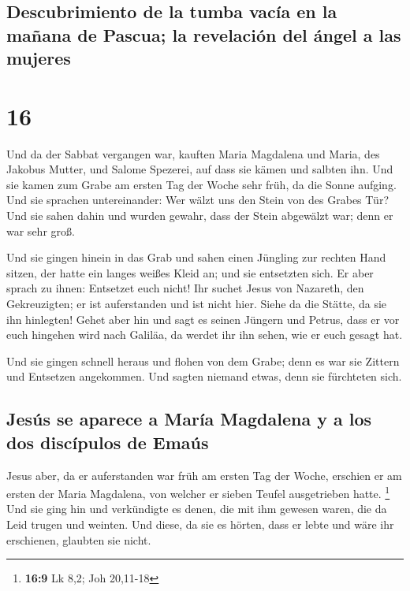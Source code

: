 \hypertarget{descubrimiento-de-la-tumba-vacuxeda-en-la-mauxf1ana-de-pascua-la-revelaciuxf3n-del-uxe1ngel-a-las-mujeres}{%
\subsection{Descubrimiento de la tumba vacía en la mañana de Pascua; la
revelación del ángel a las
mujeres}\label{descubrimiento-de-la-tumba-vacuxeda-en-la-mauxf1ana-de-pascua-la-revelaciuxf3n-del-uxe1ngel-a-las-mujeres}}

\hypertarget{section-15}{%
\section{16}\label{section-15}}

 Und da der Sabbat vergangen war, kauften Maria Magdalena
und Maria, des Jakobus Mutter, und Salome Spezerei, auf dass sie kämen
und salbten ihn.  Und sie kamen zum Grabe am ersten Tag
der Woche sehr früh, da die Sonne aufging.  Und sie
sprachen untereinander: Wer wälzt uns den Stein von des Grabes Tür?
 Und sie sahen dahin und wurden gewahr, dass der Stein
abgewälzt war; denn er war sehr groß.

 Und sie gingen hinein in das Grab und sahen einen
Jüngling zur rechten Hand sitzen, der hatte ein langes weißes Kleid an;
und sie entsetzten sich.  Er aber sprach zu ihnen:
Entsetzet euch nicht! Ihr suchet Jesus von Nazareth, den Gekreuzigten;
er ist auferstanden und ist nicht hier. Siehe da die Stätte, da sie ihn
hinlegten!  Gehet aber hin und sagt es seinen Jüngern und
Petrus, dass er vor euch hingehen wird nach Galiläa, da werdet ihr ihn
sehen, wie er euch gesagt hat.

 Und sie gingen schnell heraus und flohen von dem Grabe;
denn es war sie Zittern und Entsetzen angekommen. Und sagten niemand
etwas, denn sie fürchteten sich.

\hypertarget{jesuxfas-se-aparece-a-maruxeda-magdalena-y-a-los-dos-discuxedpulos-de-emauxfas}{%
\subsection{Jesús se aparece a María Magdalena y a los dos discípulos de
Emaús}\label{jesuxfas-se-aparece-a-maruxeda-magdalena-y-a-los-dos-discuxedpulos-de-emauxfas}}

 Jesus aber, da er auferstanden war früh am ersten Tag der
Woche, erschien er am ersten der Maria Magdalena, von welcher er sieben
Teufel ausgetrieben hatte. \footnote{\textbf{16:9} Lk 8,2; Joh 20,11-18}
 Und sie ging hin und verkündigte es denen, die mit ihm
gewesen waren, die da Leid trugen und weinten.  Und
diese, da sie es hörten, dass er lebte und wäre ihr erschienen, glaubten
sie nicht.

